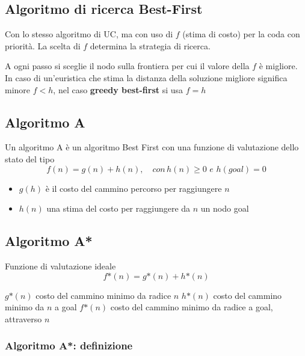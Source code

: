 \documentclass{article}
\begin{document}
\subsection{Algoritmo di ricerca Best-First}
Con lo stesso algoritmo di UC, ma con uso di $f$ (stima di costo) per la coda con priorità. La scelta di $f$ determina la strategia di ricerca.

A ogni passo si sceglie il nodo sulla frontiera per cui il valore della $f$ è migliore. In caso di un'euristica che stima la distanza della soluzione migliore significa minore $f<h$, nel caso \textbf{greedy best-first} si usa $f=h$

\subsection{Algoritmo A}
Un algoritmo A è un algoritmo Best First con una funzione di valutazione dello stato del tipo
\begin{equation}
    f(n) = g(n) + h(n),\quad con\,h(n) \geq 0 \,\, e \,\, h(goal) = 0
\end{equation}
\begin{center}
    \begin{itemize}
        \item $g(h)$ è il costo del cammino percorso per raggiungere $n$
        \item $h(n)$ una stima del costo per raggiungere da $n$ un nodo goal
    \end{itemize}
\end{center}

\subsection{Algoritmo A*}
Funzione di valutazione ideale
\begin{equation}
    f\text{*}(n) = g\text{*}(n) + h\text{*}(n)
\end{equation}
\begin{center}
    $g\text{*}(n)$ costo del cammino minimo da radice $n$\newline
    $h\text{*}(n)$ costo del cammino minimo da $n$ a goal\newline
    $f\text{*}(n)$ costo del cammino minimo da radice a goal, attraverso $n$
\end{center}
\subsubsection{Algoritmo A*: definizione}
\end{document}
